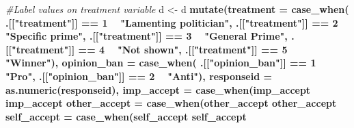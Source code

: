 \documentclass[]{book}
\newenvironment{Shaded}{\begin{snugshade}}{\end{snugshade}}
\newcommand{\KeywordTok}[1]{\textcolor[rgb]{0.13,0.29,0.53}{\textbf{#1}}}
\newcommand{\DataTypeTok}[1]{\textcolor[rgb]{0.13,0.29,0.53}{#1}}
\newcommand{\DecValTok}[1]{\textcolor[rgb]{0.00,0.00,0.81}{#1}}
\newcommand{\StringTok}[1]{\textcolor[rgb]{0.31,0.60,0.02}{#1}}
\newcommand{\CommentTok}[1]{\textcolor[rgb]{0.56,0.35,0.01}{\textit{#1}}}
\newcommand{\OperatorTok}[1]{\textcolor[rgb]{0.81,0.36,0.00}{\textbf{#1}}}
\newcommand{\NormalTok}[1]{#1}
\begin{document}
\begin{Shaded}
\begin{Highlighting}[]
{{{{{{{{{{{\CommentTok{#Label values on treatment variable}
\NormalTok{d <-}\StringTok{ }\NormalTok{d }\OperatorTok{%>%}
\StringTok{  }\KeywordTok{mutate}\NormalTok{(}\DataTypeTok{treatment =} \KeywordTok{case_when}\NormalTok{(}
\NormalTok{    .[[}\StringTok{"treatment"}\NormalTok{]] }\OperatorTok{==}\StringTok{ }\DecValTok{1} \OperatorTok{~}\StringTok{ "Lamenting politician"}\NormalTok{,}
\NormalTok{    .[[}\StringTok{"treatment"}\NormalTok{]] }\OperatorTok{==}\StringTok{ }\DecValTok{2} \OperatorTok{~}\StringTok{ "Specific prime"}\NormalTok{,}
\NormalTok{    .[[}\StringTok{"treatment"}\NormalTok{]] }\OperatorTok{==}\StringTok{ }\DecValTok{3} \OperatorTok{~}\StringTok{ "General Prime"}\NormalTok{,}
\NormalTok{    .[[}\StringTok{"treatment"}\NormalTok{]] }\OperatorTok{==}\StringTok{ }\DecValTok{4} \OperatorTok{~}\StringTok{ "Not shown"}\NormalTok{,}
\NormalTok{    .[[}\StringTok{"treatment"}\NormalTok{]] }\OperatorTok{==}\StringTok{ }\DecValTok{5} \OperatorTok{~}\StringTok{ "Winner"}\NormalTok{),}
    \DataTypeTok{opinion_ban =} \KeywordTok{case_when}\NormalTok{(}
\NormalTok{    .[[}\StringTok{"opinion_ban"}\NormalTok{]] }\OperatorTok{==}\StringTok{ }\DecValTok{1} \OperatorTok{~}\StringTok{ "Pro"}\NormalTok{,}
\NormalTok{    .[[}\StringTok{"opinion_ban"}\NormalTok{]] }\OperatorTok{==}\StringTok{ }\DecValTok{2} \OperatorTok{~}\StringTok{ "Anti"}\NormalTok{),}
    \DataTypeTok{responseid =} \KeywordTok{as.numeric}\NormalTok{(responseid),}
         \DataTypeTok{imp_accept =} \KeywordTok{case_when}\NormalTok{(imp_accept }\OperatorTok{%in%}\StringTok{ }\DecValTok{4}\OperatorTok{:}\DecValTok{5} \OperatorTok{~}\StringTok{ "Important"}\NormalTok{,}
\NormalTok{                                imp_accept }\OperatorTok{%in%}\StringTok{ }\DecValTok{1}\OperatorTok{:}\DecValTok{3} \OperatorTok{~}\StringTok{ "Not important"}\NormalTok{),}
         \DataTypeTok{other_accept =} \KeywordTok{case_when}\NormalTok{(other_accept }\OperatorTok{%in%}\StringTok{ }\DecValTok{4}\OperatorTok{:}\DecValTok{5} \OperatorTok{~}\StringTok{ "High degree"}\NormalTok{,}
\NormalTok{                                  other_accept }\OperatorTok{%in%}\StringTok{ }\DecValTok{1}\OperatorTok{:}\DecValTok{3} \OperatorTok{~}\StringTok{ "Low degree"}\NormalTok{),}
         \DataTypeTok{self_accept =} \KeywordTok{case_when}\NormalTok{(self_accept }\OperatorTok{%in%}\StringTok{ }\DecValTok{4}\OperatorTok{:}\DecValTok{5} \OperatorTok{~}\StringTok{ "High degree"}\NormalTok{,}
\NormalTok{                                 self_accept }\OperatorTok{%in%}\StringTok{ }\DecValTok{1}\OperatorTok{:}\DecValTok{3} \OperatorTok{~}\StringTok{ "Low degree"}\NormalTok{),}
}}}}}}}}}}}}}}}}}}
\end{Highlighting}
\end{Shaded}
\end{document}
